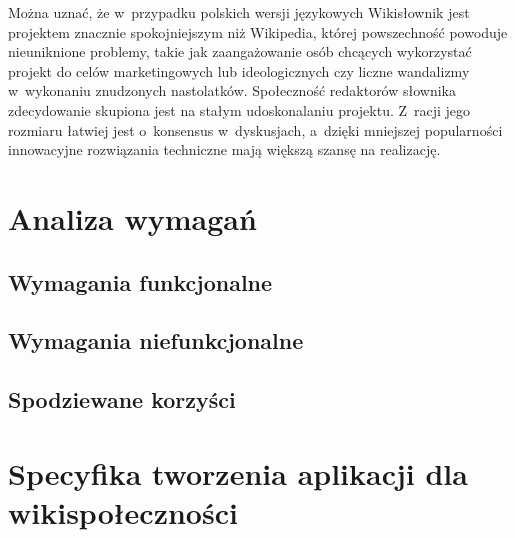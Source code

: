 Można uznać, że w~przypadku polskich wersji językowych Wikisłownik jest projektem znacznie spokojniejszym niż Wikipedia, której powszechność powoduje nieuniknione problemy, takie jak zaangażowanie osób chcących wykorzystać projekt do celów marketingowych lub ideologicznych czy liczne wandalizmy w~wykonaniu znudzonych nastolatków. Społeczność redaktorów słownika zdecydowanie skupiona jest na stałym udoskonalaniu projektu. Z~racji jego rozmiaru łatwiej jest o~konsensus w~dyskusjach, a~dzięki mniejszej popularności innowacyjne rozwiązania techniczne mają większą szansę na realizację.



\section{Analiza wymagań}
\subsection{Wymagania funkcjonalne}
\subsection{Wymagania niefunkcjonalne}
\subsection{Spodziewane korzyści}

\section{Specyfika tworzenia aplikacji dla wikispołeczności}

